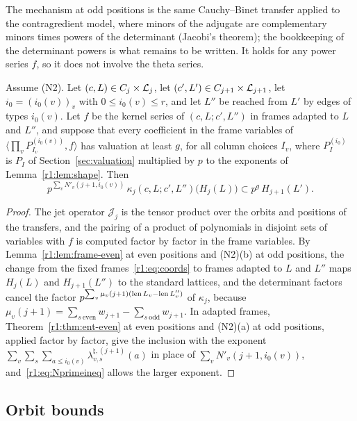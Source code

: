 \begin{remark}
The mechanism at odd positions is the same Cauchy--Binet transfer applied to the contragredient model, where minors of the adjugate are complementary minors times powers of the determinant (Jacobi's theorem); the bookkeeping of the determinant powers is what remains to be written. It holds for any power series $f$, so it does not involve the theta series.
\end{remark}

\begin{corollary}\label{r1:cor:ent}
Assume (N2). Let $(c,L)\in C_j\times\mathcal L_j$, let $(c',L')\in C_{j+1}\times\mathcal L_{j+1}$, let $i_0=(i_0(v))_v$ with $0\le i_0(v)\le r$, and let $L''$ be reached from $L'$ by edges of types $i_0(v)$. Let $f$ be the kernel series of $(c,L;c',L'')$ in frames adapted to $L$ and $L''$, and suppose that every coefficient in the frame variables of $\langle\prod_vP_{I_v}^{(i_0(v))},f\rangle$ has valuation at least $g$, for all column choices $I_v$, where $P^{(i_0)}_{I}$ is $P_I$ of Section~\ref{sec:valuation} multiplied by $p$ to the exponents of Lemma~\ref{r1:lem:shape}. Then
\[
p^{\sum_vN'_v(j+1,i_0(v))}\,\kappa_j(c,L;c',L'')\big(H_j(L)\big)\subset p^{g}\,H_{j+1}(L').
\]
\end{corollary}

\begin{proof}
The jet operator $\mathcal J_j$ is the tensor product over the orbits and positions of the transfers, and the pairing of a product of polynomials in disjoint sets of variables with $f$ is computed factor by factor in the frame variables. By Lemma~\ref{r1:lem:frame-even} at even positions and (N2)(b) at odd positions, the change from the fixed frames~\eqref{r1:eq:coords} to frames adapted to $L$ and $L''$ maps $H_j(L)$ and $H_{j+1}(L'')$ to the standard lattices, and the determinant factors cancel the factor $p^{\sum_v\mu_v(j+1)(\operatorname{len} L_v-\operatorname{len} L''_v)}$ of $\kappa_j$, because $\mu_v(j+1)=\sum_{s\ \mathrm{even}}w_{j+1}-\sum_{s\ \mathrm{odd}}w_{j+1}$. In adapted frames, Theorem~\ref{r1:thm:ent-even} at even positions and (N2)(a) at odd positions, applied factor by factor, give the inclusion with the exponent $\sum_v\sum_s\sum_{a\le i_0(v)}\lambda^{\natural,(j+1)}_{v,s}(a)$ in place of $\sum_vN'_v(j+1,i_0(v))$, and~\eqref{r1:eq:Nprimeineq} allows the larger exponent.
\end{proof}

\subsection{Orbit bounds}\label{r1:sec:R1orbit}

